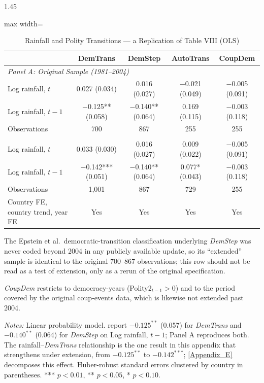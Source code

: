 \documentclass[12pt]{article}
\begin{document}
\begin{bibunit}[jpe]
\begin{spacing}{1.45}
\begin{table}[H]
\centering
\begin{adjustbox}{max width=\textwidth}
\begin{threeparttable}
\caption{Rainfall and Polity Transitions --- a Replication of Table VIII (OLS)}
\label{tab:A6}
\begin{tabular}{lcccc}
\toprule
 & DemTrans & DemStep & AutoTrans & CoupDem \\
\midrule
\multicolumn{5}{l}{\textit{Panel A: Original Sample (1981--2004)}} \\
Log rainfall, $t$   & 0.027 (0.034)      & 0.016 (0.027)      & $-$0.021 (0.049)   & $-$0.005 (0.091) \\
Log rainfall, $t-1$ & $-$0.125** (0.058) & $-$0.140** (0.064) & 0.169 (0.115)      & $-$0.003 (0.118) \\
Observations         & 700                & 867                & 255                & 255 \\
\addlinespace
\multicolumn{5}{l}{\textit{Panel B: Extended Sample (1981--2024)}} \\
Log rainfall, $t$   & 0.033 (0.030)      & 0.016 (0.027)      & 0.009 (0.022)      & $-$0.005 (0.091) \\
Log rainfall, $t-1$ & $-$0.142*** (0.051) & $-$0.140** (0.064) & 0.077* (0.043)     & $-$0.003 (0.118) \\
Observations         & 1{,}001            & 867\tnote{a}       & 729                & 255\tnote{b} \\
\midrule
Country FE, country trend, year FE & Yes & Yes & Yes & Yes \\
\bottomrule
\end{tabular}
\begin{tablenotes}[flushleft]
\footnotesize
\item[a] The Epstein et al.\ democratic-transition classification underlying \textit{DemStep} was never coded beyond 2004 in any publicly available update, so its ``extended'' sample is identical to the original 700--867 observations; this row should not be read as a test of extension, only as a rerun of the original specification.
\item[b] \textit{CoupDem} restricts to democracy-years (Polity2$_{t-1}>0$) and to the period covered by the original coup-events data, which is likewise not extended past 2004.
\item \textit{Notes:} Linear probability model. \citet{bruckner2011rain} report $-0.125^{**}$ (0.057) for \textit{DemTrans} and $-0.140^{**}$ (0.064) for \textit{DemStep} on Log rainfall, $t-1$; Panel A reproduces both. The rainfall--\textit{DemTrans} relationship is the one result in this appendix that strengthens under extension, from $-0.125^{**}$ to $-0.142^{***}$; \ref{Appendix_E} decomposes this effect. Huber-robust standard errors clustered by country in parentheses. *** $p<0.01$, ** $p<0.05$, * $p<0.10$.
\end{tablenotes}
\end{threeparttable}
\end{adjustbox}
\end{table}


\end{spacing}
\end{bibunit}
\end{document}
